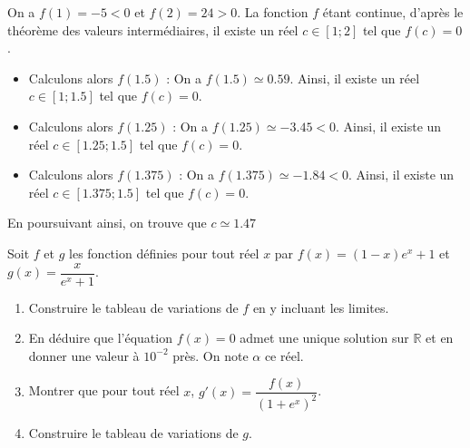 \documentclass[11pt,fleqn, openany]{book} %
\begin{document}
\begin{solution}
On a $f(1)=-5<0$ et $f(2)=24>0$. La fonction $f$ étant continue, d'après le théorème des valeurs intermédiaires, il existe un réel $c \in [1;2]$ tel que $f(c)=0$.

\begin{itemize}
\item Calculons alors $f(1.5)$ : On a $f(1.5)\simeq 0.59$. Ainsi, il existe un réel $c \in [1 ;1.5]$ tel que $f(c)=0$.
\item Calculons alors $f(1.25)$ : On a $f(1.25)\simeq -3.45<0$. Ainsi, il existe un réel $c \in [1.25 ;1.5]$ tel que $f(c)=0$.
\item Calculons alors $f(1.375)$ : On a $f(1.375)\simeq -1.84<0$. Ainsi, il existe un réel $c \in [1.375 ;1.5]$ tel que $f(c)=0$.
\end{itemize}
En poursuivant ainsi, on trouve que $c\simeq 1.47$
\end{solution}



\begin{exercise}Soit $f$ et $g$ les fonction définies pour tout réel $x$ par $f(x)=(1-x)e^x+1$ et $g(x)=\dfrac{x}{e^x+1}$.
\begin{enumerate}
\item Construire le tableau de variations de $f$ en y incluant les limites.
\item En déduire que l'équation $f(x)=0$ admet une unique solution sur $\mathbb{R}$ et en donner une valeur à $10^{-2}$ près. On note $\alpha$ ce réel.
\item Montrer que pour tout réel $x$, $g'(x)=\dfrac{f(x)}{(1+e^x)^2}$.
\item Construire le tableau de variations de $g$.
\end{enumerate}\end{exercise}
\end{document}
